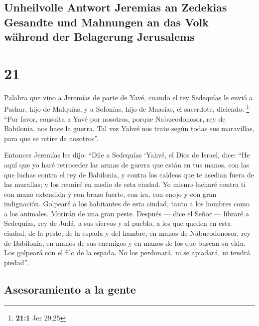 \hypertarget{unheilvolle-antwort-jeremias-an-zedekias-gesandte-und-mahnungen-an-das-volk-wuxe4hrend-der-belagerung-jerusalems}{%
\subsection{Unheilvolle Antwort Jeremias an Zedekias Gesandte und
Mahnungen an das Volk während der Belagerung
Jerusalems}\label{unheilvolle-antwort-jeremias-an-zedekias-gesandte-und-mahnungen-an-das-volk-wuxe4hrend-der-belagerung-jerusalems}}

\hypertarget{section-20}{%
\section{21}\label{section-20}}

 Palabra que vino a Jeremías de parte de Yavé, cuando el
rey Sedequías le envió a Pashur, hijo de Malquías, y a Sofonías, hijo de
Maasías, el sacerdote, diciendo: \footnote{\textbf{21:1} Jer 29,25}
 ``Por favor, consulta a Yavé por nosotros, porque
Nabucodonosor, rey de Babilonia, nos hace la guerra. Tal vez Yahvé nos
trate según todas sus maravillas, para que se retire de nosotros''.

 Entonces Jeremías les dijo: ``Dile a Sedequías
 `Yahvé, el Dios de Israel, dice: ``He aquí que yo haré
retroceder las armas de guerra que están en tus manos, con las que
luchas contra el rey de Babilonia, y contra los caldeos que te asedian
fuera de las murallas; y los reuniré en medio de esta ciudad.
 Yo mismo lucharé contra ti con mano extendida y con brazo
fuerte, con ira, con enojo y con gran indignación. 
Golpearé a los habitantes de esta ciudad, tanto a los hombres como a los
animales. Morirán de una gran peste.  Después --- dice el
Señor --- libraré a Sedequías, rey de Judá, a sus siervos y al pueblo, a
los que queden en esta ciudad, de la peste, de la espada y del hambre,
en manos de Nabucodonosor, rey de Babilonia, en manos de sus enemigos y
en manos de los que buscan su vida. Los golpeará con el filo de la
espada. No los perdonará, ni se apiadará, ni tendrá piedad''.

\hypertarget{asesoramiento-a-la-gente}{%
\subsection{Asesoramiento a la gente}\label{asesoramiento-a-la-gente}}

